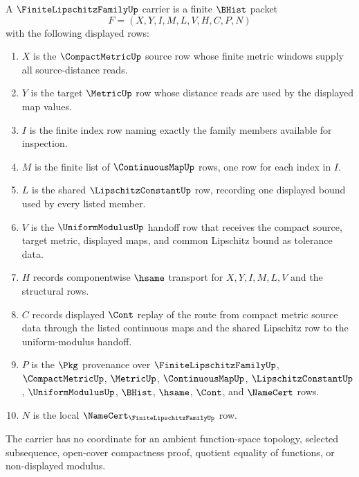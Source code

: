 \begin{definition}
\label{def:finite-lipschitz-family-carrier}
A $\FiniteLipschitzFamilyUp$ carrier is a finite $\BHist$ packet
$$
F=(X,Y,I,M,L,V,H,C,P,N)
$$
with the following displayed rows:
\begin{enumerate}
\item $X$ is the $\CompactMetricUp$ source row whose finite metric windows supply all source-distance reads.
\item $Y$ is the target $\MetricUp$ row whose distance reads are used by the displayed map values.
\item $I$ is the finite index row naming exactly the family members available for inspection.
\item $M$ is the finite list of $\ContinuousMapUp$ rows, one row for each index in $I$.
\item $L$ is the shared $\LipschitzConstantUp$ row, recording one displayed bound used by every listed member.
\item $V$ is the $\UniformModulusUp$ handoff row that receives the compact source, target metric, displayed maps, and common Lipschitz bound as tolerance data.
\item $H$ records componentwise $\hsame$ transport for $X,Y,I,M,L,V$ and the structural rows.
\item $C$ records displayed $\Cont$ replay of the route from compact metric source data through the listed continuous maps and the shared Lipschitz row to the uniform-modulus handoff.
\item $P$ is the $\Pkg$ provenance over $\FiniteLipschitzFamilyUp$, $\CompactMetricUp$, $\MetricUp$, $\ContinuousMapUp$, $\LipschitzConstantUp$, $\UniformModulusUp$, $\BHist$, $\hsame$, $\Cont$, and $\NameCert$ rows.
\item $N$ is the local $\NameCert_{\FiniteLipschitzFamilyUp}$ row.
\end{enumerate}
The carrier has no coordinate for an ambient function-space topology, selected subsequence, open-cover compactness proof, quotient equality of functions, or non-displayed modulus.
\end{definition}


